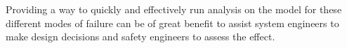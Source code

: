 Providing a way to quickly and effectively run analysis on the model %
for these different modes of failure can be of great benefit to assist system engineers to make design decisions and safety engineers to assess the effect.

\begin{comment}
The fault analysis on the top level WBS system was performed on the 11 top-level properties applying the max fault hypothesis and probabilistic fault hypothesis separately. It requires between 2 and 4 minutes to run either compositional analysis with max fault hypothesis or monolithic analysis with probabilistic fault hypothesis on the model. The analysis is computationally inexpensive, allowing quick iterations between systems and safety engineers.

\janet{We first applied compositional analysis with max one fault hypothesis at all layers of the model.} Most properties were verified except for the \textit{Inadvertent braking at the wheel} properties. \janet{The failure of the verification for those properties shows that they are not resilient to a single fault.} The {\em counterexample} returned by the tools allowed us to straightforwardly diagnose the fault conditions that lead to property failure: In this model, there is a single pedal position sensor for the brake pedal. If this sensor fails, it can command braking without a pilot request.

This counterexample can be used to further analyze the system design.  For our model, there are several possible reasons for failure: it could be that redundant sensors are required on the pedals (here we note that the architecture of the pedal assembly is not discussed in AIR6110) or that the phase of flight is sufficiently short that we need to adjust our pedal failure rate to match this phase of flight, rather than normalizing the failure rate to per-flight-hour.  

\janet{We then applied monolithic analysis with probabilistic fault hypothesis of $10^{-9}$ fault threshold. The \textit{Inadvertent braking at the wheel} properties failed. Updating the probability of occurrence for the sensor components identified above to be above the fault threshold allowed the properties to pass, showing that increasing the reliability of those components help increase the reliability of the system.}


\end{comment}
